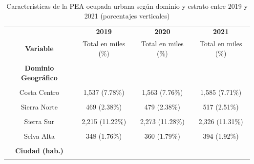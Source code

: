 \documentclass[
  letterpaper,
  12pt,
  oneside,
  spanish,
  doublespacing,
  headsepline,
  parskip]{MastersDoctoralThesis}
\begin{document}
\hypertarget{tbl-peadomes}{}
\begin{table}[H]
\caption{\label{tbl-peadomes}Características de la PEA ocupada urbana según dominio y estrato entre
2019 y 2021 (porcentajes verticales) }\tabularnewline

\centering\begingroup\fontsize{10}{12}\selectfont

\begin{tabular}{cccc}
\toprule
\multicolumn{1}{c}{ } & \multicolumn{1}{c}{\textbf{2019}} & \multicolumn{1}{c}{\textbf{2020}} & \multicolumn{1}{c}{\textbf{2021}} \\
\cmidrule(l{3pt}r{3pt}){2-2} \cmidrule(l{3pt}r{3pt}){3-3} \cmidrule(l{3pt}r{3pt}){4-4}
\textbf{Variable} & Total en miles (\%) & Total en miles (\%) & Total en miles (\%)\\
\midrule
\cellcolor{gray!6}{\textbf{Nacional}} & \cellcolor{gray!6}{19,747 (100.00\%)} & \cellcolor{gray!6}{20,153 (100.00\%)} & \cellcolor{gray!6}{20,558 (100.00\%)}\\
\textbf{Dominio Geográfico} &  &  & \\
\cellcolor{gray!6}{Costa Norte} & \cellcolor{gray!6}{3,285 (16.64\%)} & \cellcolor{gray!6}{3,349 (16.62\%)} & \cellcolor{gray!6}{3,406 (16.57\%)}\\
Costa Centro & 1,537 (7.78\%) & 1,563 (7.76\%) & 1,585 (7.71\%)\\
\cellcolor{gray!6}{Costa Sur} & \cellcolor{gray!6}{466 (2.36\%)} & \cellcolor{gray!6}{468 (2.32\%)} & \cellcolor{gray!6}{481 (2.34\%)}\\
\addlinespace
Sierra Norte & 469 (2.38\%) & 479 (2.38\%) & 517 (2.51\%)\\
\cellcolor{gray!6}{Sierra Centro} & \cellcolor{gray!6}{1,497 (7.58\%)} & \cellcolor{gray!6}{1,531 (7.59\%)} & \cellcolor{gray!6}{1,554 (7.56\%)}\\
Sierra Sur & 2,215 (11.22\%) & 2,273 (11.28\%) & 2,326 (11.31\%)\\
\cellcolor{gray!6}{Selva Baja} & \cellcolor{gray!6}{1,613 (8.17\%)} & \cellcolor{gray!6}{1,663 (8.25\%)} & \cellcolor{gray!6}{1,653 (8.04\%)}\\
Selva Alta & 348 (1.76\%) & 360 (1.79\%) & 394 (1.92\%)\\
\addlinespace
\cellcolor{gray!6}{Lima Metropolitana} & \cellcolor{gray!6}{8,317 (42.12\%)} & \cellcolor{gray!6}{8,467 (42.01\%)} & \cellcolor{gray!6}{8,641 (42.03\%)}\\
\textbf{Ciudad (hab.)} &  &  & \\
\cellcolor{gray!6}{500 000 a más} & \cellcolor{gray!6}{9,718 (49.21\%)} & \cellcolor{gray!6}{9,926 (49.25\%)} & \cellcolor{gray!6}{10,259 (49.90\%)}\\

\end{tabular}
\end{table}
\end{document}
